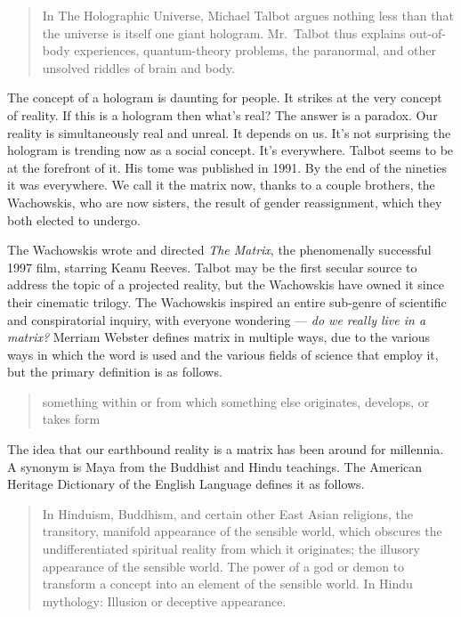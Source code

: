 \documentclass[letterpaper,11pt,twoside,titlepage,onecolumn,openany]{book}
\begin{document}
\begin{quote}
In The Holographic Universe, Michael Talbot argues nothing less than
that the universe is itself one giant hologram. Mr.~Talbot thus explains
out-of-body experiences, quantum-theory problems, the paranormal, and
other unsolved riddles of brain and body.
\end{quote}

The concept of a hologram is daunting for people. It strikes at the very
concept of reality. If this is a hologram then what's real? The answer
is a paradox. Our reality is simultaneously real and unreal. It depends
on us. It's not surprising the hologram is trending now as a social
concept. It's everywhere. Talbot seems to be at the forefront of it. His
tome was published in 1991. By the end of the nineties it was
everywhere. We call it the matrix now, thanks to a couple brothers, the
Wachowskis, who are now sisters, the result of gender reassignment,
which they both elected to undergo.

The Wachowskis wrote and directed \emph{The Matrix}, the phenomenally
successful 1997 film, starring Keanu Reeves. Talbot may be the first
secular source to address the topic of a projected reality, but the
Wachowskis have owned it since their cinematic trilogy. The Wachowskis
inspired an entire sub-genre of scientific and conspiratorial inquiry,
with everyone wondering --- \emph{do we really live in a matrix?}
Merriam Webster defines matrix in multiple ways, due to the various ways
in which the word is used and the various fields of science that employ
it, but the primary definition is as follows.

\begin{quote}
something within or from which something else originates, develops, or
takes form
\end{quote}

The idea that our earthbound reality is a matrix has been around for
millennia. A synonym is Maya from the Buddhist and Hindu teachings. The
American Heritage Dictionary of the English Language defines it as
follows.

\begin{quote}
In Hinduism, Buddhism, and certain other East Asian religions, the
transitory, manifold appearance of the sensible world, which obscures
the undifferentiated spiritual reality from which it originates; the
illusory appearance of the sensible world. The power of a god or demon
to transform a concept into an element of the sensible world. In Hindu
mythology: Illusion or deceptive appearance.
\end{quote}
\end{document}
